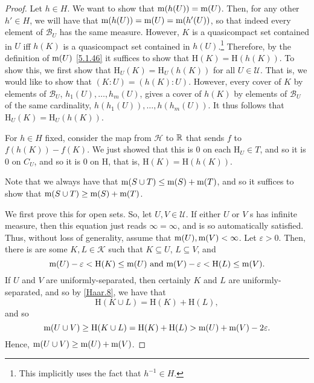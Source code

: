 \begin{thm}
\begin{savenotes}
\begin{proof}
Let $h\in H$.  We want to show that $\mathrm{m} (h(U))=\mathrm{m} (U)$.  Then, for any other $h'\in H$, we will have that $\mathrm{m} (h(U))=\mathrm{m} (U)=\mathrm{m} (h'(U))$, so that indeed every element of $\mathcal{B}_U$ has the same measure.  However, $K$ is a quasicompact set contained in $U$ iff $h(K)$ is a quasicompact set contained in $h(U)$.\footnote{This implicitly uses the fact that $h^{-1}\in H$.}  Therefore, by the definition of $\mathrm{m} (U)$ \eqref{5.1.46} it suffices to show that $\mathrm{H}(K)=\mathrm{H}(h(K))$.  To show this, we first show that $\mathrm{H}_U(K)=\mathrm{H}_U(h(K))$ for all $U\in \mathcal{U}$.  That is, we would like to show that $(K:U)=(h(K):U)$.  However, every cover of $K$ by elements of $\mathcal{B}_U$, $h_1(U),\ldots ,h_m(U)$, gives a cover of $h(K)$ by elements of $\mathcal{B}_U$ of the same cardinality, $h(h_1(U)),\ldots ,h(h_m(U))$.  It thus follows that $\mathrm{H}_U(K)=\mathrm{H}_U(h(K))$.

For $h\in H$ fixed, consider the map from $\mathcal{H}$ to $\mathbb{R}$ that sends $f$ to $f(h(K))-f(K)$.  We just showed that this is $0$ on each $\mathrm{H}_U\in T$, and so it is $0$ on $C_U$, and so it is $0$ on $\mathrm{H}$, that is, $\mathrm{H}(K)=\mathrm{H}(h(K))$.

Note that we always have that $\mathrm{m} (S\cup T)\leq \mathrm{m} (S)+\mathrm{m} (T)$, and so it suffices to show that $\mathrm{m} (S\cup T)\geq \mathrm{m} (S)+\mathrm{m} (T)$.

We first prove this for open sets.  So, let $U,V\in \mathcal{U}$.  If either $U$ or $V$ s has infinite measure, then this equation just reads $\infty =\infty$, and is so automatically satisfied.  Thus, without loss of generality, assume that $\mathrm{m} (U),\mathrm{m} (V)<\infty$.  Let $\varepsilon >0$.  Then, there is are some $K,L\in \mathcal{K}$ such that $K\subseteq U$, $L\subseteq V$, and
\begin{equation}
\mathrm{m} (U)-\varepsilon <\mathrm{H}(K)\leq \mathrm{m} (U)\text{ and }\mathrm{m} (V)-\varepsilon <\mathrm{H}(L)\leq \mathrm{m} (V).
\end{equation}
If $U$ and $V$ are uniformly-separated, then certainly $K$ and $L$ are uniformly-separated, and so by \cref{Haar.8}, we have that
\begin{equation}
\mathrm{H}(K\cup L)=\mathrm{H}(K)+\mathrm{H}(L),
\end{equation}
and so
\begin{equation}
\mathrm{m} (U\cup V)\geq \mathrm{H}(K\cup L)=\mathrm{H}(K)+\mathrm{H}(L)>\mathrm{m} (U)+\mathrm{m} (V)-2\varepsilon .
\end{equation}
Hence, $\mathrm{m} (U\cup V)\geq \mathrm{m} (U)+\mathrm{m} (V)$.


\end{proof}
\end{savenotes}
\end{thm}

